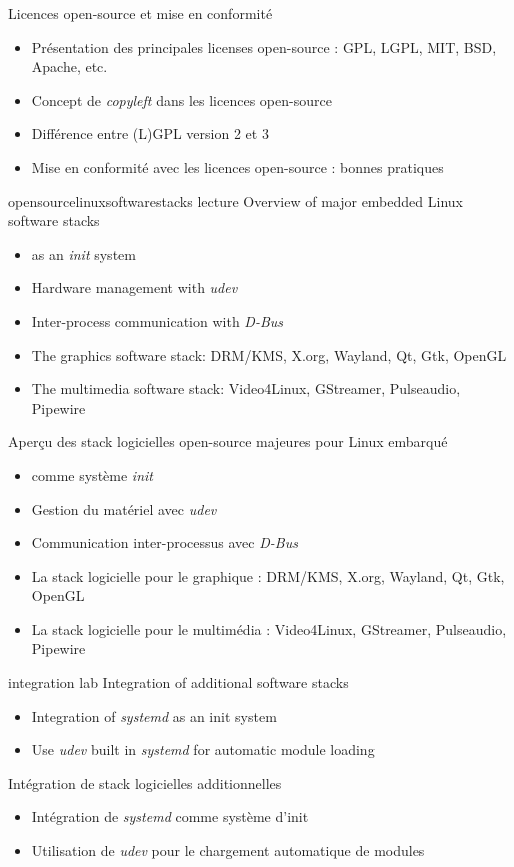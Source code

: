 {Licences open-source et mise en conformité}
{
  \begin{itemize}
  \item Présentation des principales licenses open-source : GPL, LGPL,
    MIT, BSD, Apache, etc.
  \item Concept de {\em copyleft} dans les licences open-source
  \item Différence entre (L)GPL version 2 et 3
  \item Mise en conformité avec les licences open-source : bonnes
    pratiques
  \end{itemize}
}
{opensourcelinuxsoftwarestacks}
{lecture}
{Overview of major embedded Linux software stacks}
{
  \begin{itemize}
  \item {} as an {\em init} system
  \item Hardware management with {\em udev}
  \item Inter-process communication with {\em D-Bus}
  \item The graphics software stack: DRM/KMS, X.org, Wayland, Qt, Gtk,
    OpenGL
  \item The multimedia software stack: Video4Linux, GStreamer,
    Pulseaudio, Pipewire
  \end{itemize}
}
{Aperçu des stack logicielles open-source majeures pour Linux embarqué}
{
  \begin{itemize}
  \item {} comme système {\em init}
  \item Gestion du matériel avec {\em udev}
  \item Communication inter-processus avec {\em D-Bus}
  \item La stack logicielle pour le graphique : DRM/KMS, X.org,
    Wayland, Qt, Gtk, OpenGL
  \item La stack logicielle pour le multimédia : Video4Linux,
    GStreamer, Pulseaudio, Pipewire
  \end{itemize}
}
{integration}
{lab}
{Integration of additional software stacks}
{
  \begin{itemize}
  \item Integration of {\em systemd} as an init system
  \item Use {\em udev} built in {\em systemd} for automatic module
    loading
  \end{itemize}
}
{Intégration de stack logicielles additionnelles}
{
  \begin{itemize}
  \item Intégration de {\em systemd} comme système d'init
  \item Utilisation de {\em udev} pour le chargement automatique de
    modules
  \end{itemize}
}
